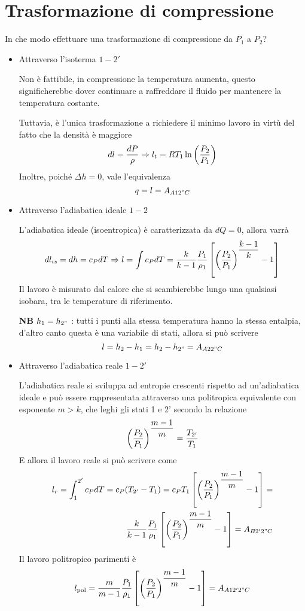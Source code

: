 \section{Trasformazione di compressione}
\begin{adjustwidth}{2in}{}



	
	In che modo effettuare una trasformazione di compressione da $P_1$ a $P_2$? \newline 
	\begin{itemize}
		
		\item Attraverso l'isoterma $1-2'$ 
		
		Non è fattibile, in compressione la temperatura aumenta, questo significherebbe dover continuare a raffreddare il fluido per mantenere la temperatura costante.
		
		Tuttavia, è l'unica trasformazione a richiedere il minimo lavoro in virtù del fatto che la densità è maggiore 
		\[dl = {dP\over\rho}\Rightarrow l_t=RT_1\ln\left(P_2\over P_1\right)\]
		Inoltre, poiché $\Delta h = 0$, vale l'equivalenza 
		\[q=l=A_{A12"C}\]
		
		\item Attraverso l'adiabatica ideale $1-2$
		
		L'adiabatica ideale (isoentropica) è caratterizzata da $dQ =0$, allora varrà 
		\[dl_{is} = dh = c_PdT \Rightarrow l = \int c_PdT = \dfrac{k}{k-1} {P_1\over\rho_1}\left[\left(P_2\over P_1\right)^{\dfrac{k-1}{k}}-1\right]\]
		Il lavoro è misurato dal calore che si scambierebbe lungo una qualsiasi isobara, tra le temperature di riferimento. 
		
		\textbf{NB} $h_1 = h_{2"}~$: tutti i punti alla stessa temperatura hanno la stessa entalpia, d'altro canto questa è una variabile di stati, allora si può scrivere 
		\[l = h_2-h_1 = h_2 -  h_{2"} = A_{A22"C}\]
		
		
		
		\item Attraverso l'adiabatica reale $1-2'$
		
		L'adiabatica reale si sviluppa ad entropie crescenti rispetto ad un'adiabatica ideale e può essere rappresentata attraverso una politropica equivalente con esponente $m>k$, che leghi gli stati 1 e 2' secondo la relazione  
		\[\left(P_2\over P_1\right)^{\dfrac{m-1}{m}} = {T_{2'}\over T_1}\] 
		E allora il lavoro reale si può scrivere come 
		\[\begin{split}
			l_r = \int_{1}^{2'}c_PdT = c_P(T_{2'}-T_1) = c_PT_1\left[\left(P_2\over P_1\right)^{\dfrac{m-1}{m}}-1\right]= \\ \dfrac{k}{k-1} {P_1\over\rho_1}\left[\left(P_2\over P_1\right)^{\dfrac{m-1}{m}}-1\right] = A_{B2'2"C}
		\end{split}\]
		Il lavoro politropico parimenti è  
		\[l_\text{pol} =  \dfrac{m}{m-1} {P_1\over\rho_1}\left[\left(P_2\over P_1\right)^{\dfrac{m-1}{m}}-1\right]= A_{A12'2"C}\]
	\end{itemize}
	

\end{adjustwidth}
